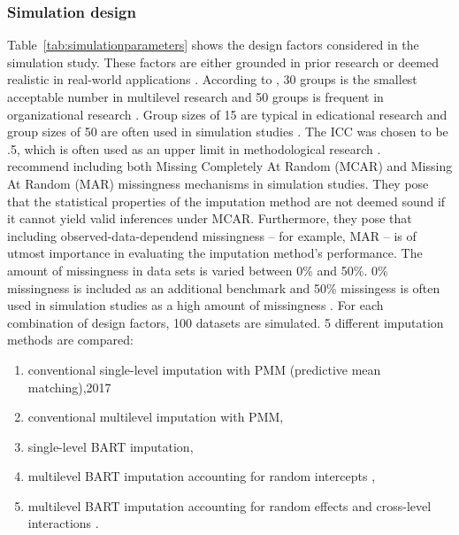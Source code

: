 \documentclass[10pt, a4paper, titlepage]{article}
\begin{document}
\subsubsection{Simulation design} 
Table~\ref{tab:simulationparameters} shows the design factors considered in the simulation study. These factors are either grounded in prior research or deemed realistic in real-world applications \citep{gulliford1999, murray2003, hox2017, grund2018, enders2018a, enders2020}. According to \citet{kreft2007}, 30 groups is the smallest acceptable number in multilevel research and 50 groups is frequent in organizational research \citep{maas2005}. Group sizes of 15 are typical in edicational research \citep{ludtke2017} and group sizes of 50 are often used in simulation studies \citep{maas2005,enders2018,akkayahocagil2023,grund2018,enders2018a,enders2020}. The ICC was chosen to be .5, which is often used as an upper limit in methodological research \citep{enders2020,enders2018,enders2018a,mistler2017,grund2018,salditt2023}.~\citet{oberman2023} recommend including both Missing Completely At Random (MCAR) and Missing At Random (MAR) missingness mechanisms in simulation studies. They pose that the statistical properties of the imputation method are not deemed sound if it cannot yield valid inferences under MCAR. Furthermore, they pose that including observed-data-dependend missingness -- for example, MAR -- is of utmost importance in evaluating the imputation method's performance. The amount of missingness in data sets is varied between 0\% and 50\%. 0\% missingness is included as an additional benchmark and 50\% missingess is often used in simulation studies as a high amount of missingness \citep{ludtke2017,grund2016,schouten2021}. For each combination of design factors, 100 datasets are simulated. 5 different imputation methods are compared: 
\begin{enumerate}
    \item conventional single-level imputation with PMM (predictive mean matching),2017
    \item conventional multilevel imputation with PMM,
    \item single-level BART imputation,
    \item multilevel BART imputation accounting for random intercepts \citep{chen2020, wagner2020, tan2016},
    \item multilevel BART imputation accounting for random effects and cross-level interactions \citep{dorie2022}.
\end{enumerate} 
\end{document}
